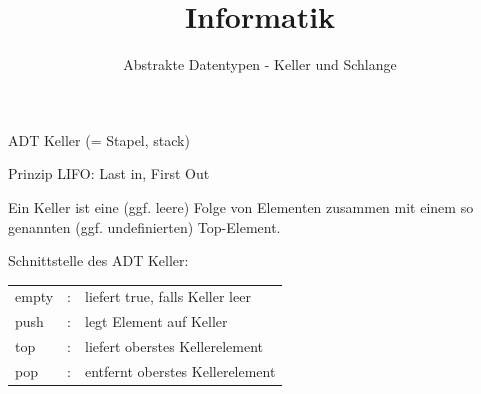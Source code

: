 \documentclass{beamer}
\begin{document}
\title{Informatik}   
\author{Abstrakte Datentypen - Keller und Schlange} 
\date{}
\frame{\titlepage} 


\begin{frame}[fragile]

ADT Keller  (= Stapel, stack)  

Prinzip LIFO: Last in, First Out

Ein Keller ist eine (ggf. leere) Folge von Elementen zusammen mit einem so genannten
(ggf. undefinierten) Top-Element.  

Schnittstelle des ADT Keller:

\footnotesize
\begin{tabular}{l l l}
 empty & :  & liefert true, falls Keller leer \\
 push & :  &  legt Element auf Keller \\
 top & :   & liefert oberstes Kellerelement\\ 
 pop & :  &  entfernt oberstes Kellerelement \\
\end{tabular}
\end{frame}
\end{document}

